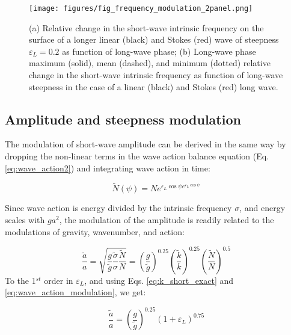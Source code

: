 \documentclass[draft]{agujournal2019}
\begin{document}
\begin{figure}[h]
\label{fig:frequency_modulation}
\centering
\texttt{[image: figures/fig\_frequency\_modulation\_2panel.png]}
\caption{
  (a) Relative change in the short-wave intrinsic frequency on the surface of a
  longer linear (black) and Stokes (red) wave of steepness $\varepsilon_L = 0.2$
  as function of long-wave phase;
  (b) Long-wave phase maximum (solid), mean (dashed), and minimum (dotted)
  relative change in the short-wave intrinsic frequency as function of long-wave
  steepness in the case of a linear (black) and Stokes (red) long wave.
}
\end{figure}

\subsection{Amplitude and steepness modulation}
\label{subsection:amplitude_modulation}

The modulation of short-wave amplitude can be derived in the same way by
dropping the non-linear terms in the wave action balance equation
(Eq. \ref{eq:wave_action2}) and integrating wave action in time:

\begin{equation}
\label{eq:wave_action_modulation}
\widetilde{N}(\psi) = N e^{\varepsilon_L \cos{\psi} e^{\varepsilon_L \cos{\psi}}}
\end{equation}

Since wave action is energy divided by the intrinsic frequency $\sigma$,
and energy scales with $ga^2$, the modulation of the amplitude is readily
related to the modulations of gravity, wavenumber, and action:

\begin{equation}
\label{eq:wave_amplitude_modulation}
\dfrac{\widetilde{a}}{a} = \sqrt{
  \dfrac{g}{\widetilde{g}}
  \dfrac{\widetilde{\sigma}}{\sigma}
  \dfrac{\widetilde{N}}{N}}
=
  \left( \dfrac{g}{\widetilde{g}} \right)^{0.25}
  \left( \dfrac{\widetilde{k}}{k} \right)^{0.25}
  \left( \dfrac{\widetilde{N}}{N} \right)^{0.5}
\end{equation}
To the 1$^{st}$ order in $\varepsilon_L$, and using Eqs. \ref{eq:k_short_exact}
and \ref{eq:wave_action_modulation}, we get:

\begin{equation}
\label{eq:wave_amplitude_modulation_order1}
\dfrac{\widetilde{a}}{a} = 
  \left( \dfrac{g}{\widetilde{g}} \right)^{0.25}
  \left( 1 + \varepsilon_L \right)^{0.75}
\end{equation}
\end{document}
